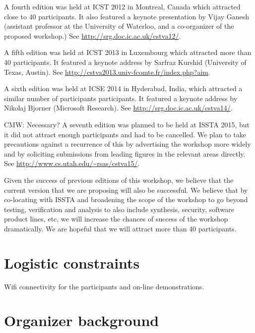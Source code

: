 \documentclass{sig-alternate}
\newcommand{\cmw}[1]{{\color{red} CMW: #1}}
\begin{document}
A fourth edition was held at ICST 2012 in Montreal, Canada which attracted
close to 40 participants. It also featured a keynote presentation by Vijay
Ganesh (assistant professor at the University of Waterloo, and a co-organizer
of the proposed workshop.) 
See \url{http://srg.doc.ic.ac.uk/cstva12/}.

A fifth edition was held at ICST 2013 in Luxembourg which attracted more than
40 participants. It featured a keynote address by Sarfraz Kurshid (University
of Texas, Austin). 
See \url{http://cstva2013.univ-fcomte.fr/index.php?aim}.

A sixth edition was held at ICSE 2014 in Hyderabad, India, which attracted a
similar number of participants participants. It featured a keynote address by
Nikolaj Bjorner (Microsoft Research). 
See \url{http://srg.doc.ic.ac.uk/cstva14/}.

\cmw{Necessary?}
A seventh edition was planned to be held at ISSTA 2015, but it did not attract
enough participants and had to be cancelled. We plan to take precautions
against a recurrence of this by advertising the workshop more widely and by
soliciting submissions from leading figures in the relevant areas directly.
See \url{http://www.cs.utah.edu/~rsas/cstva15/}.

Given the success of previous editions of this workshop, we believe that the
current version that we are proposing will also be successful. We believe that
by co-locating with ISSTA and broadening the scope of the workshop to go beyond
testing, verification and analysis to also include synthesis, security,
software product lines, etc, we will increase the chances of success of the
workshop dramatically. We are hopeful that we will attract more than 40
participants. 

\section{Logistic constraints}

Wifi connectivity for the participants and on-line demonstrations.

\section{Organizer background}
\end{document}
